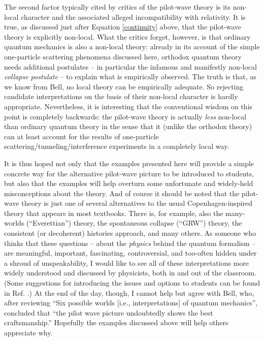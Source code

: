 \documentclass[aps,prc,twocolumn,letterpaper,floatfix]{revtex4}
\begin{document}
The second factor typically cited by critics of the pilot-wave theory
is its non-local character and the associated alleged incompatibility
with relativity. 
It is true, as discussed just after Equation \eqref{continuity} above,
that the pilot-wave theory is explicitly non-local.  What the critics
forget, however, is that ordinary quantum mechanics is also a
non-local theory:  already in its account of the simple one-particle 
scattering phenomena discussed here, orthodox quantum theory needs
additional postulates -- in particular the infamous and manifestly
non-local \emph{collapse postulate} -- to explain what is empirically
observed.  The truth is that, as we know from Bell, no local theory
can be empirically adequate.  \cite{belltheorem}  So rejecting candidate
interpretations on the basis of their non-local character is
hardly appropriate.  Nevertheless, it is interesting that the
conventional wisdom on this point is completely backwards:  
the pilot-wave theory is actually \emph{less} non-local than ordinary
quantum theory in the sense that it (unlike the orthodox theory) can
at least account for the results of one-particle
scattering/tunneling/interference experiments in a completely local
way.  

It is thus hoped not only that the examples presented here will
provide a simple concrete way for the alternative pilot-wave picture
to be introduced to students, but also that the
examples will help overturn some unfortunate and widely-held 
misconceptions about the theory.  And of course it should be noted
that the pilot-wave theory is just one of several alternatives to the
usual Copenhagen-inspired theory that appears in most textbooks.
There is, for example, also the many-worlds (``Everettian'') theory,
the spontaneous collapse (``GRW'') theory, the consistent (or
decoherent) histories approach, and many others.   As
someone who thinks that these questions -- about the \emph{physics}
behind the quantum formalism -- are meaningful, important,
fascinating, controversial, and too-often hidden under a shroud of
unspeakability, I would like to see all of these interpretations more
widely understood and discussed by physicists, both in and out of the
classroom.  (Some suggestions for introducing the issues and options
to students can be found in Ref. .)
At the end of the day, though, I cannot help but agree with Bell, who,
after reviewing ``Six possible worlds [i.e., interpretations] of
quantum mechanics'', concluded that ``the pilot wave picture
undoubtedly shows the best craftsmanship.''  \cite{bell6}  Hopefully
the examples discussed above will help others appreciate why.
\end{document}
